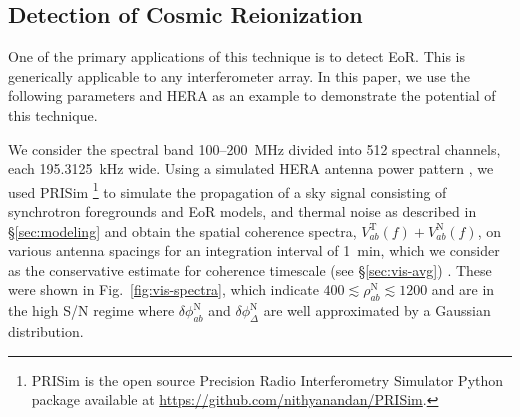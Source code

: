 \documentclass[
reprint,
superscriptaddress,
amsmath,
amssymb,
aps,
prd
]{revtex4-1}
\begin{document}

\subsection{Detection of Cosmic Reionization}\label{sec:EoR-detection}

One of the primary applications of this technique is to detect EoR. This is generically applicable to any interferometer array. In this paper, we use the following parameters and HERA as an example to demonstrate the potential of this technique.

We consider the spectral band 100--200~MHz divided into 512 spectral channels, each 195.3125~kHz wide. Using a simulated HERA antenna power pattern \cite{deb17}, we used PRISim \footnote{PRISim is the open source Precision Radio Interferometry Simulator Python package available at \href{https://github.com/nithyanandan/PRISim}{https://github.com/nithyanandan/PRISim}.} to simulate the propagation of a sky signal consisting of synchrotron foregrounds and EoR models, and thermal noise as described in \S\ref{sec:modeling} and obtain the spatial coherence spectra, $V_{ab}^\textrm{T}(f) + V_{ab}^\textrm{N}(f)$, on various antenna spacings for an integration interval of 1~min, which we consider as the conservative estimate for coherence timescale (see \S\ref{sec:vis-avg}) \cite{car18}. These were shown in Fig.~\ref{fig:vis-spectra}, which indicate $400\lesssim \rho_{ab}^\textrm{N} \lesssim 1200$ and are in the high S/N regime where $\delta\phi_{ab}^\textrm{N}$ and $\delta\phi_\Delta^\textrm{N}$ are well approximated by a Gaussian distribution. 
\end{document}
